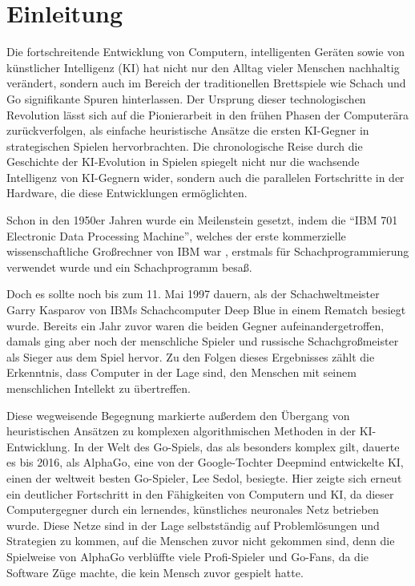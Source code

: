 \chapter{Einleitung}
\label{chapter:einleitung}

Die fortschreitende Entwicklung von Computern, intelligenten Geräten sowie von künstlicher Intelligenz (\acs{KI}) hat nicht nur den Alltag vieler Menschen nachhaltig verändert, sondern auch im Bereich der traditionellen Brettspiele wie Schach und Go signifikante Spuren hinterlassen. Der Ursprung dieser technologischen Revolution lässt sich auf die Pionierarbeit in den frühen Phasen der Computerära zurückverfolgen, als einfache heuristische Ansätze die ersten \acs{KI}-Gegner in strategischen Spielen hervorbrachten. Die chronologische Reise durch die Geschichte der \acs{KI}-Evolution in Spielen spiegelt nicht nur die wachsende Intelligenz von \acs{KI}-Gegnern wider, sondern auch die parallelen Fortschritte in der Hardware, die diese Entwicklungen ermöglichten.

Schon in den 1950er Jahren wurde ein Meilenstein gesetzt, indem die \enquote{\acs{IBM} 701 Electronic Data Processing Machine}, welches der erste kommerzielle wissenschaftliche Großrechner von \ac{IBM} war \cite{2023.IBM701}, erstmals für Schachprogrammierung verwendet wurde und ein Schachprogramm besaß. \cite{2014.EndeDerBescheidenheit}

Doch es sollte noch bis zum 11. Mai 1997 dauern, als der Schachweltmeister Garry Kasparov von \ac{IBM}s Schachcomputer Deep Blue in einem Rematch besiegt wurde. Bereits ein Jahr zuvor waren die beiden Gegner aufeinandergetroffen, damals ging aber noch der menschliche Spieler und russische Schachgroßmeister als Sieger aus dem Spiel hervor. Zu den Folgen dieses Ergebnisses zählt die Erkenntnis, dass Computer in der Lage sind, den Menschen mit seinem menschlichen Intellekt zu übertreffen. \cite{2022.DeepBlue}

Diese wegweisende Begegnung markierte außerdem den Übergang von heuristischen Ansätzen zu komplexen algorithmischen Methoden in der \ac{KI}-Entwicklung. In der Welt des Go-Spiels, das als besonders komplex gilt, dauerte es bis 2016, als AlphaGo, eine von der Google-Tochter Deepmind entwickelte \ac{KI}, einen der weltweit besten Go-Spieler, Lee Sedol, besiegte. Hier zeigte sich erneut ein deutlicher Fortschritt in den Fähigkeiten von Computern und \ac{KI}, da dieser Computergegner durch ein lernendes, künstliches neuronales Netz betrieben wurde. Diese Netze sind in der Lage selbstständig auf Problemlösungen und Strategien zu kommen, auf die Menschen zuvor nicht gekommen sind, denn die Spielweise von AlphaGo verblüffte viele Profi-Spieler und Go-Fans, da die Software Züge machte, die kein Mensch zuvor gespielt hatte. \cite{2016.AlphaGo}

